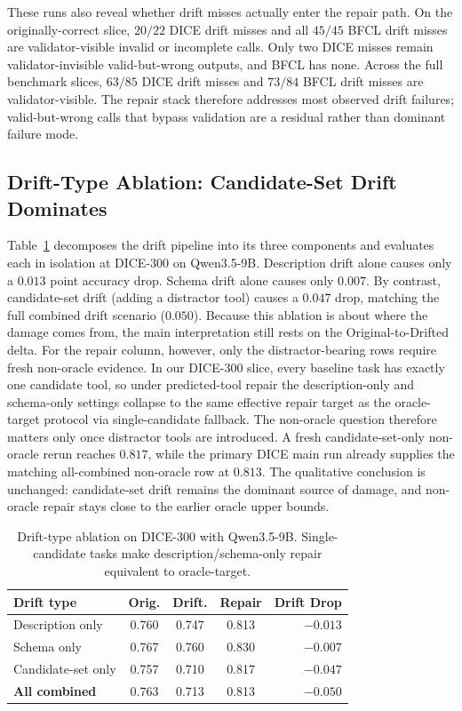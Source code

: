 \documentclass[runningheads]{llncs}
\begin{document}
These runs also reveal whether drift misses actually enter the repair path.
On the originally-correct slice, $20/22$ DICE drift misses and all $45/45$ BFCL
drift misses are validator-visible invalid or incomplete calls. Only two DICE
misses remain validator-invisible valid-but-wrong outputs, and BFCL has none.
Across the full benchmark slices, $63/85$ DICE drift misses and $73/84$ BFCL
drift misses are validator-visible. The repair stack therefore addresses most
observed drift failures; valid-but-wrong calls that bypass validation are a
residual rather than dominant failure mode.

\subsection{Drift-Type Ablation: Candidate-Set Drift Dominates}
\label{sec:drift-ablation}
Table~\ref{tab:drift-ablation} decomposes the drift pipeline into its three
components and evaluates each in isolation at DICE-300 on Qwen3.5-9B. Description
drift alone causes only a $0.013$ point accuracy drop. Schema drift alone causes
only $0.007$. By contrast, candidate-set drift (adding a distractor tool) causes a
$0.047$ drop, matching the full combined drift scenario ($0.050$). Because this
ablation is about where the damage comes from, the main interpretation still rests
on the Original-to-Drifted delta. For the repair column, however, only the
distractor-bearing rows require fresh non-oracle evidence. In our DICE-300 slice,
every baseline task has exactly one candidate tool, so under predicted-tool repair
the description-only and schema-only settings collapse to the same effective repair
target as the oracle-target protocol via single-candidate fallback. The non-oracle
question therefore matters only once distractor tools are introduced. A fresh
candidate-set-only non-oracle rerun reaches $0.817$, while the primary DICE main
run already supplies the matching all-combined non-oracle row at $0.813$. The
qualitative conclusion is unchanged: candidate-set drift remains the dominant
source of damage, and non-oracle repair stays close to the earlier oracle upper
bounds.

\begin{table}[t]
\caption{Drift-type ablation on DICE-300 with Qwen3.5-9B. Single-candidate tasks
make description/schema-only repair equivalent to oracle-target.}
\label{tab:drift-ablation}
\centering
\small
\begin{tabular}{lcccr}
\toprule
Drift type & Orig. & Drift. & Repair & Drift Drop \\
\midrule
Description only     & 0.760 & 0.747 & 0.813 & $-0.013$ \\
Schema only          & 0.767 & 0.760 & 0.830 & $-0.007$ \\
Candidate-set only   & 0.757 & 0.710 & 0.817 & $-0.047$ \\
\textbf{All combined}& 0.763 & 0.713 & 0.813 & $-0.050$ \\
\bottomrule
\end{tabular}
\end{table}
\end{document}
